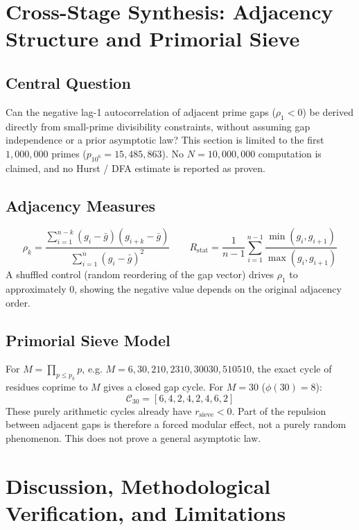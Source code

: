 \documentclass[12pt,a4paper]{article}
\begin{document}
\section{Cross-Stage Synthesis: Adjacency Structure and Primorial Sieve}
\subsection{Central Question}
Can the negative lag-1 autocorrelation of adjacent prime gaps ($\rho_1 < 0$) be derived directly from small-prime divisibility constraints, without assuming gap independence or a prior asymptotic law? This section is limited to the first $1,000,000$ primes ($p_{10^6} = 15,485,863$). No $N = 10,000,000$ computation is claimed, and no Hurst / DFA estimate is reported as proven.

\subsection{Adjacency Measures}
\[
\rho_k = \frac{\sum_{i=1}^{n-k} (g_i - \bar{g})(g_{i+k} - \bar{g})}{\sum_{i=1}^{n} (g_i - \bar{g})^2}
\qquad
R_{\text{stat}} = \frac{1}{n-1} \sum_{i=1}^{n-1} \frac{\min(g_i, g_{i+1})}{\max(g_i, g_{i+1})}
\]
A shuffled control (random reordering of the gap vector) drives $\rho_1$ to approximately $0$, showing the negative value depends on the original adjacency order.

\subsection{Primorial Sieve Model}
For $M = \prod_{p \le p_k} p$, e.g. $M = 6, 30, 210, 2310, 30030, 510510$, the exact cycle of residues coprime to $M$ gives a closed gap cycle. For $M = 30$ ($\phi(30) = 8$):
\[
\mathcal{C}_{30} = [6, 4, 2, 4, 2, 4, 6, 2]
\]
These purely arithmetic cycles already have $r_{\text{sieve}} < 0$. Part of the repulsion between adjacent gaps is therefore a forced modular effect, not a purely random phenomenon. This does not prove a general asymptotic law.

\section{Discussion, Methodological Verification, and Limitations}
\end{document}
